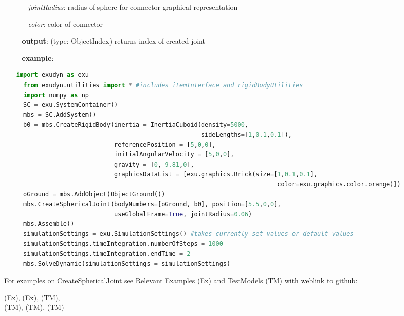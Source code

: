 \begin{itemize}[leftmargin=0.7cm]
\begin{itemize}[leftmargin=1.2cm]
\item[]{\it jointRadius}: radius of sphere for connector graphical representation
\item[]{\it color}: color of connector
\end{itemize}
\item[--]
{\bf output}: (type: ObjectIndex) returns index of created joint
\item[--]
{\bf example}: \vspace{-12pt}\ei\begin{lstlisting}[language=Python, xleftmargin=36pt]
  import exudyn as exu
  from exudyn.utilities import * #includes itemInterface and rigidBodyUtilities
  import numpy as np
  SC = exu.SystemContainer()
  mbs = SC.AddSystem()
  b0 = mbs.CreateRigidBody(inertia = InertiaCuboid(density=5000,
                                                   sideLengths=[1,0.1,0.1]),
                           referencePosition = [5,0,0],
                           initialAngularVelocity = [5,0,0],
                           gravity = [0,-9.81,0],
                           graphicsDataList = [exu.graphics.Brick(size=[1,0.1,0.1],
                                                                        color=exu.graphics.color.orange)])
  oGround = mbs.AddObject(ObjectGround())
  mbs.CreateSphericalJoint(bodyNumbers=[oGround, b0], position=[5.5,0,0],
                           useGlobalFrame=True, jointRadius=0.06)
  mbs.Assemble()
  simulationSettings = exu.SimulationSettings() #takes currently set values or default values
  simulationSettings.timeIntegration.numberOfSteps = 1000
  simulationSettings.timeIntegration.endTime = 2
  mbs.SolveDynamic(simulationSettings = simulationSettings)
\end{lstlisting}\vspace{-24pt}\bi\item[]\vspace{-24pt}\vspace{12pt}\end{itemize}
%

%
\noindent For examples on CreateSphericalJoint see Relevant Examples (Ex) and TestModels (TM) with weblink to github:
\bi
 \item \footnotesize {} (Ex), 
 (Ex), 
 (TM), 
\\  (TM), 
 (TM), 
 (TM)
\ei

